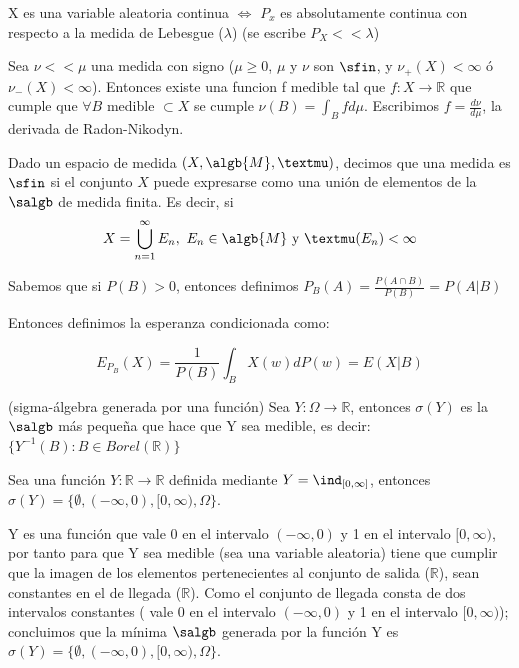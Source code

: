 \documentclass{apuntes}
\begin{document}
\begin{defn}
X es una variable aleatoria continua $\Leftrightarrow$ $P_x$ es absolutamente continua con respecto a la medida de Lebesgue ($\lambda$) (se escribe $P_X << \lambda$)
\end{defn}

\begin{theorem}
Sea $\nu << \mu$ una medida con signo ($\mu \geq 0$, $\mu$ y $\nu$ son $\sfin$, y $\nu_+(X) < \infty$ ó $\nu_-(X) < \infty$). Entonces existe una funcion f medible tal que $f:X \rightarrow \mathbb{R}$ que cumple que $\forall B$ medible $\subset X$ se cumple $\nu(B)=\int_Bfd\mu$. Escribimos $f=\frac{d\nu}{d\mu}$, la derivada de Radon-Nikodyn. 
\end{theorem}

\begin{defn}\label{defSigmaFinita}
Dado un espacio de medida $(X, \algb{M}, µ)$, decimos que una medida es $\sfin$ si el conjunto $X$ puede expresarse como una unión de elementos de la $\salgb$ de medida finita. Es decir, si \[X=\bigcup_{n=1}^{\infty}E_n, \ E_n \in \algb{M} \text{ y }µ(E_n)< \infty\]
\end{defn}

\begin{defn}

Sabemos que si $P(B)>0$, entonces definimos $P_B(A)=\frac{P(A \cap B)}{P(B)}=P(A|B)$

Entonces definimos la esperanza condicionada como:

\[
E_{P_B}(X)=\frac{1}{P(B)}\int_{B}X(w)dP(w)=E(X|B)
\]
\end{defn}

\begin{defn}(sigma-álgebra generada por una función)
Sea $Y: \Omega \rightarrow \mathbb{R}$, entonces $\sigma(Y)$ es la $\salgb$ más pequeña que hace que Y sea medible, es decir: $\{Y^{-1}(B):B \in Borel(\mathbb{R})\}$
\end{defn}

\begin{example}
Sea una función $Y:\mathbb{R} \rightarrow \mathbb{R}$ definida mediante $Y=\ind_{[0,\infty]}$, entonces $\sigma(Y)=\{\emptyset, (-\infty, 0), [0, \infty), \Omega \}$.

\begin{expla}
Y es una función que vale 0 en el intervalo $(-\infty, 0)$ y 1 en el intervalo $[0, \infty)$, por tanto para que Y sea medible (sea una variable aleatoria) tiene que cumplir que la imagen de los elementos pertenecientes al conjunto de salida ($\mathbb{R}$), sean constantes en el de llegada ($\mathbb{R}$). Como el conjunto de llegada consta de dos intervalos constantes ( vale 0 en el intervalo $(-\infty, 0)$ y 1 en el intervalo $[0, \infty)$); concluimos que la mínima $\salgb$ generada por la función Y es $\sigma(Y)=\{\emptyset, (-\infty, 0), [0, \infty), \Omega \}$.
\end{expla}
 
\end{example}
\end{document}
